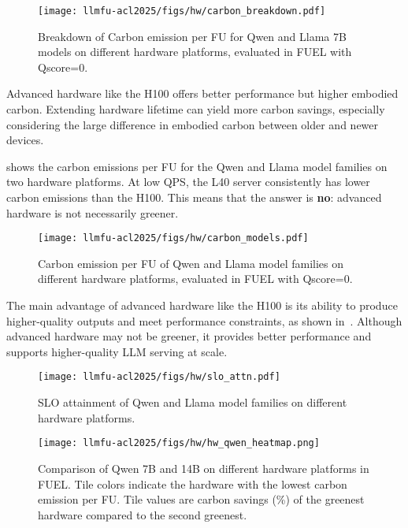 \begin{figure}[!t]
    \centering
    \texttt{[image: llmfu-acl2025/figs/hw/carbon\_breakdown.pdf]}
    \vspace{-0.15in}
    \caption{Breakdown of Carbon emission per FU for Qwen and Llama 7B models on different hardware platforms, evaluated in FUEL with Qscore=0.}
    \label{fig:hw_carbon_breakdown}
\end{figure}

Advanced hardware like the H100 offers better performance but higher embodied carbon. Extending hardware lifetime can yield more carbon savings, especially considering the large difference in embodied carbon between older and newer devices.



\noindent {} shows the carbon emissions per FU for the Qwen and Llama model families on two hardware platforms. At low QPS, the L40 server consistently has lower carbon emissions than the H100. This means that the answer is \textbf{no}: advanced hardware is not necessarily greener.

\begin{figure}[!t]
    \centering
    \texttt{[image: llmfu-acl2025/figs/hw/carbon\_models.pdf]}
    \vspace{-0.15in}
    \caption{Carbon emission per FU of Qwen and Llama model families on different hardware platforms, evaluated in FUEL with Qscore=0.}
    \label{fig:hw_carbon_models}
\end{figure}

The main advantage of advanced hardware like the H100 is its ability to produce higher-quality outputs and meet performance constraints, as shown in~. Although advanced hardware may not be greener, it provides better performance and supports higher-quality LLM serving at scale.

\begin{figure}[!t]
    \centering
    \texttt{[image: llmfu-acl2025/figs/hw/slo\_attn.pdf]}
    \vspace{-0.15in}
    \caption{SLO attainment of Qwen and Llama model families on different hardware platforms.}
    \label{fig:hw_slo_attn}
\end{figure}

\begin{figure}[!t]
    \centering
    \texttt{[image: llmfu-acl2025/figs/hw/hw\_qwen\_heatmap.png]}
    \vspace{-0.2in}
    \caption{Comparison of Qwen 7B and 14B on different hardware platforms in FUEL. Tile colors indicate the hardware with the lowest carbon emission per FU. Tile values are carbon savings (\%) of the greenest hardware compared to the second greenest.}
    \label{fig:hw_heatmap_qwen_sep}
\end{figure}

